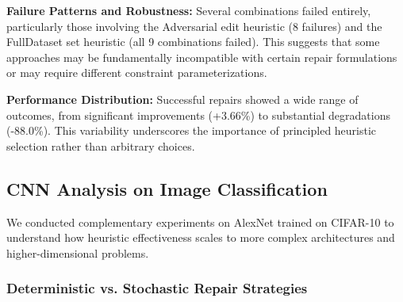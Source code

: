 \documentclass{article}
\begin{document}
\textbf{Failure Patterns and Robustness:} Several combinations failed entirely, particularly those involving the Adversarial edit heuristic (8 failures) and the FullDataset set heuristic (all 9 combinations failed). This suggests that some approaches may be fundamentally incompatible with certain repair formulations or may require different constraint parameterizations.

\textbf{Performance Distribution:} Successful repairs showed a wide range of outcomes, from significant improvements (+3.66\%) to substantial degradations (-88.0\%). This variability underscores the importance of principled heuristic selection rather than arbitrary choices.

\subsection{CNN Analysis on Image Classification}

We conducted complementary experiments on AlexNet trained on CIFAR-10 to understand how heuristic effectiveness scales to more complex architectures and higher-dimensional problems.

\subsubsection{Deterministic vs. Stochastic Repair Strategies}
\end{document}
